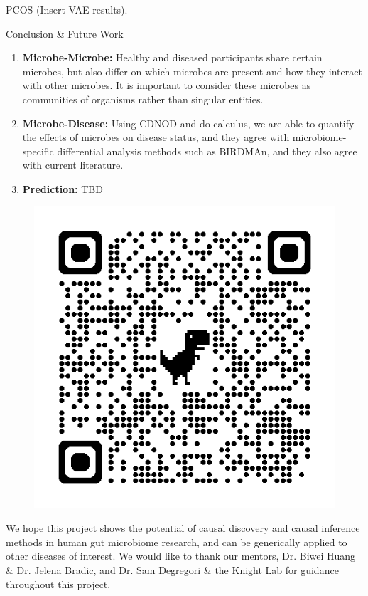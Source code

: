 \documentclass[final]{beamer}
\newlength{\colwidth}
\begin{document}
\begin{frame}[t]
\begin{columns}[t]
\begin{column}{\colwidth}
\begin{block}{PCOS}
   (Insert VAE results).

  \end{block}

  \begin{block}{Conclusion \& Future Work}
  
  \begin{enumerate}
      \item \textbf{Microbe-Microbe:} Healthy and diseased participants share certain microbes, but also differ on which microbes are present and how they interact with other microbes. It is important to consider these microbes as communities of organisms rather than singular entities.      
      \item \textbf{Microbe-Disease:} Using CDNOD and do-calculus, we are able to quantify the effects of microbes on disease status, and they agree with microbiome-specific differential analysis methods such as BIRDMAn, and they also agree with current literature.
      \item \textbf{Prediction:} TBD
   \end{enumerate}
	
	\begin{figure}
           \centering
           \includegraphics[width=\linewidth]{website_qr.png}
    	\end{figure} We hope this project shows the potential of causal discovery and causal inference methods in human gut microbiome research, and can be generically applied to other diseases of interest. We would like to thank our mentors, Dr. Biwei Huang \& Dr. Jelena Bradic,  and Dr. Sam Degregori \& the Knight Lab for guidance throughout this project.
    

\end{block}
\end{column}
\end{columns}
\end{frame}
\end{document}
